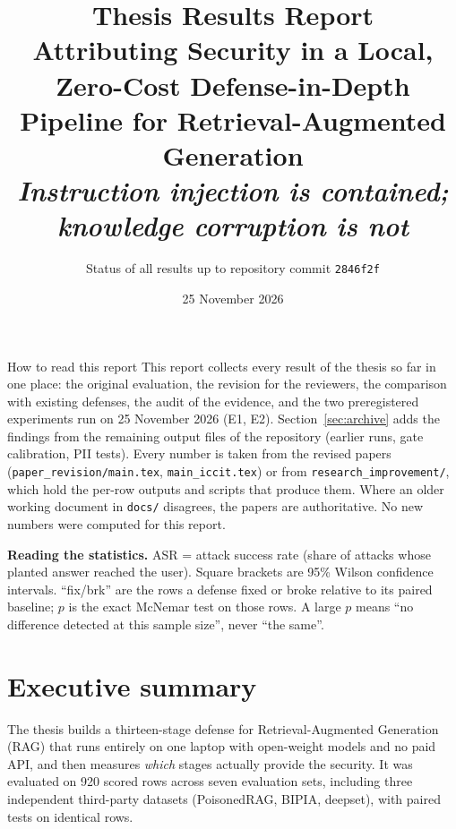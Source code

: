 \documentclass[11pt,a4paper]{article}
\title{\textbf{Thesis Results Report}\\[0.3em]
\large Attributing Security in a Local, Zero-Cost Defense-in-Depth Pipeline for Retrieval-Augmented Generation\\[0.2em]
\normalsize\itshape Instruction injection is contained; knowledge corruption is not}
\author{Status of all results up to repository commit \texttt{2846f2f}}
\date{25 November 2026}
\begin{document}
\maketitle

\begin{keybox}{How to read this report}
This report collects every result of the thesis so far in one place: the original evaluation, the revision for
the reviewers, the comparison with existing defenses, the audit of the evidence, and the two preregistered
experiments run on 25 November 2026 (E1, E2). Section~\ref{sec:archive} adds the findings from the remaining output files of the repository (earlier runs, gate calibration, PII tests). Every number is taken from the revised papers
(\texttt{paper\_revision/main.tex}, \texttt{main\_iccit.tex}) or from \texttt{research\_improvement/}, which hold the
per-row outputs and scripts that produce them. Where an older working document in \texttt{docs/} disagrees, the
papers are authoritative. No new numbers were computed for this report.

\textbf{Reading the statistics.} ASR = attack success rate (share of attacks whose planted answer reached the
user). Square brackets are 95\% Wilson confidence intervals. ``fix/brk'' are the rows a defense fixed or broke
relative to its paired baseline; $p$ is the exact McNemar test on those rows. A large $p$ means ``no difference
detected at this sample size'', never ``the same''.
\end{keybox}

\tableofcontents
\newpage

\section{Executive summary}

The thesis builds a thirteen-stage defense for Retrieval-Augmented Generation (RAG) that runs entirely on one
laptop with open-weight models and no paid API, and then measures \emph{which} stages actually provide the
security. It was evaluated on 920 scored rows across seven evaluation sets, including three independent
third-party datasets (PoisonedRAG, BIPIA, deepset), with paired tests on identical rows.
\end{document}
